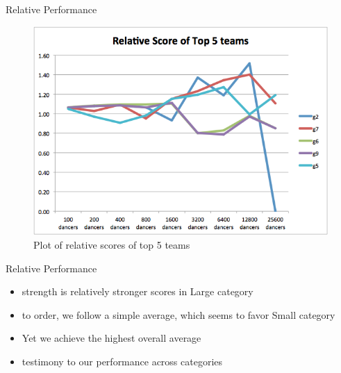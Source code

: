 \begin{frame}{Relative Performance}

\begin{figure}[htbp]
\centering
\includegraphics{imgs/team-5-rel.png}
\caption{Plot of relative scores of top 5 teams\label{team-5-rel}}
\end{figure}

\end{frame}

\begin{frame}{Relative Performance}

\begin{itemize}
\tightlist
\item
  strength is relatively stronger scores in Large category
\item
  to order, we follow a simple average, which seems to favor Small
  category
\item
  Yet we achieve the highest overall average
\item
  testimony to our performance across categories
\end{itemize}

\end{frame}

